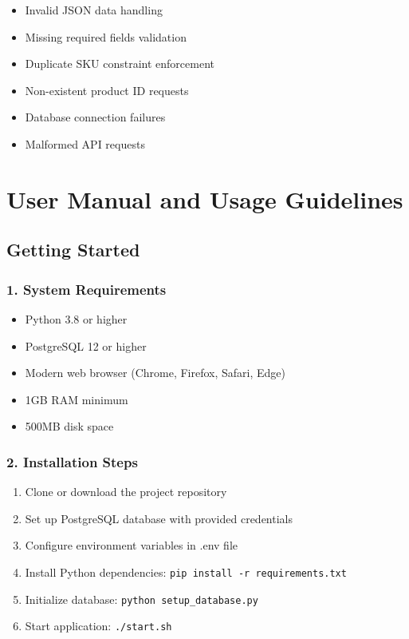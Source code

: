 \documentclass[12pt,a4paper]{article}
\begin{document}
\begin{warningbox}
\begin{itemize}
    \item Invalid JSON data handling
    \item Missing required fields validation
    \item Duplicate SKU constraint enforcement
    \item Non-existent product ID requests
    \item Database connection failures
    \item Malformed API requests
\end{itemize}
\end{warningbox}

\section{User Manual and Usage Guidelines}

\subsection{Getting Started}

\subsubsection{1. System Requirements}
\begin{itemize}
    \item Python 3.8 or higher
    \item PostgreSQL 12 or higher
    \item Modern web browser (Chrome, Firefox, Safari, Edge)
    \item 1GB RAM minimum
    \item 500MB disk space
\end{itemize}

\subsubsection{2. Installation Steps}
\begin{enumerate}
    \item Clone or download the project repository
    \item Set up PostgreSQL database with provided credentials
    \item Configure environment variables in .env file
    \item Install Python dependencies: \texttt{pip install -r requirements.txt}
    \item Initialize database: \texttt{python setup\_database.py}
    \item Start application: \texttt{./start.sh}
\end{enumerate}
\end{document}
